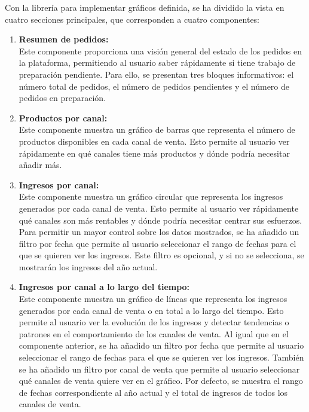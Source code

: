 Con la librería para implementar gráficos definida, se ha dividido la vista en cuatro secciones principales, que corresponden a cuatro componentes:

\begin{enumerate}
    \item \textbf{Resumen de pedidos:} \\
          Este componente proporciona una visión general del estado de los pedidos en la plataforma, permitiendo al usuario saber rápidamente si tiene trabajo de preparación pendiente. Para ello, se presentan tres bloques informativos: el número total de pedidos, el número de pedidos pendientes y el número de pedidos en preparación.
    \item \textbf{Productos por canal:} \\
          Este componente muestra un gráfico de barras que representa el número de productos disponibles en cada canal de venta. Esto permite al usuario ver rápidamente en qué canales tiene más productos y dónde podría necesitar añadir más.
    \item \textbf{Ingresos por canal:} \\
          Este componente muestra un gráfico circular que representa los ingresos generados por cada canal de venta. Esto permite al usuario ver rápidamente qué canales son más rentables y dónde podría necesitar centrar sus esfuerzos. Para permitir un mayor control sobre los datos mostrados, se ha añadido un filtro por fecha que permite al usuario seleccionar el rango de fechas para el que se quieren ver los ingresos. Este filtro es opcional, y si no se selecciona, se mostrarán los ingresos del año actual.
    \item \textbf{Ingresos por canal a lo largo del tiempo:} \\
          Este componente muestra un gráfico de líneas que representa los ingresos generados por cada canal de venta o en total a lo largo del tiempo. Esto permite al usuario ver la evolución de los ingresos y detectar tendencias o patrones en el comportamiento de los canales de venta. Al igual que en el componente anterior, se ha añadido un filtro por fecha que permite al usuario seleccionar el rango de fechas para el que se quieren ver los ingresos. También se ha añadido un filtro por canal de venta que permite al usuario seleccionar qué canales de venta quiere ver en el gráfico. Por defecto, se muestra el rango de fechas correspondiente al año actual y el total de ingresos de todos los canales de venta.
\end{enumerate}

